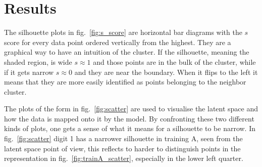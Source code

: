 \documentclass[twocolumn,gsifonts,twoside]{gsipaper}
\begin{document}
\section{Results}
The silhouette plots in fig.~\ref{fig:s_score} are horizontal bar diagrams with the $s$ score for every data point ordered vertically from the highest. They are a graphical way to have an intuition of the cluster. If the silhouette, meaning the shaded region, is wide $s\approx1$ and those points are in the bulk of the cluster, while if it gets narrow $s\approx0$ and they are near the boundary. When it flips to the left it means that they are more easily identified as points belonging to the neighbor cluster.

The plots of the form in fig.~\ref{fig:scatter} are used to visualise the latent space and how the data is mapped onto it by the model. By confronting these two different kinds of plots, one gets a sense of what it means for a silhouette to be narrow. In fig.~\ref{fig:scatter} digit 1 has a narrower silhouette in training A, seen from the latent space point of view, this reflects to harder to distinguish points in the representation in fig.~\ref{fig:trainA_scatter}, especially in the lower left quarter.
\end{document}
